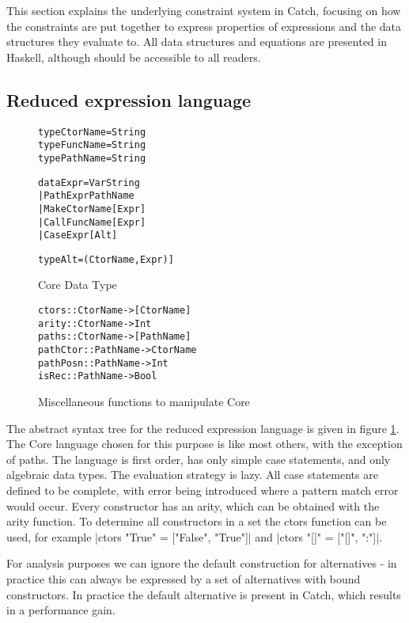 \documentclass[preprint]{sigplanconf}
\newcommand{\C}[1]{\textsf{#1}}
\newenvironment{code}{\begin{alltt}\small}{\end{alltt}}
\begin{document}
This section explains the underlying constraint system in Catch, focusing on how the constraints are put together to express properties of expressions and the data structures they evaluate to. All data structures and equations are presented in Haskell, although should be accessible to all readers.

\subsection{Reduced expression language}

\begin{figure}
\begin{code}
type CtorName  =  String
type FuncName  =  String
type PathName  =  String

data Expr  =  Var String
           |  Path Expr PathName
           |  Make CtorName [Expr]
           |  Call FuncName [Expr]
           |  Case Expr [Alt]

type Alt = (CtorName, Expr)]
\end{code}
\caption{Core Data Type}
\label{fig:core}
\end{figure}

\begin{figure}
\begin{code}
ctors :: CtorName -> [CtorName]
arity :: CtorName -> Int
paths :: CtorName -> [PathName]
pathCtor :: PathName -> CtorName
pathPosn :: PathName -> Int
isRec :: PathName -> Bool
\end{code}
\caption{Miscellaneous functions to manipulate Core}
\end{figure}

The abstract syntax tree for the reduced expression language is given in figure \ref{fig:core}. The Core language chosen for this purpose is like most others, with the exception of paths. The language is first order, has only simple case statements, and only algebraic data types. The evaluation strategy is lazy. All case statements are defined to be complete, with error being introduced where a pattern match error would occur. Every constructor has an arity, which can be obtained with the \C{arity} function. To determine all constructors in a set the \C{ctors} function can be used, for example |ctors "True" = ["False", "True"]| and |ctors "[]" = ["[]", ":"]|.

For analysis purposes we can ignore the default construction for alternatives - in practice this can always be expressed by a set of alternatives with bound constructors. In practice the default alternative is present in Catch, which results in a performance gain.
\end{document}
